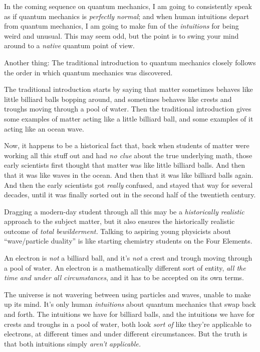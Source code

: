 {
 In the coming sequence on quantum mechanics, I am going to
consistently speak as if quantum mechanics is \textit{perfectly
normal}; and when human intuitions depart from quantum mechanics, I am
going to make fun of the \textit{intuitions} for being weird and
unusual. This may seem odd, but the point is to swing your mind around
to a \textit{native} quantum point of view.}

{
 Another thing: The traditional introduction to quantum mechanics
closely follows the order in which quantum mechanics was discovered.}

{
 The traditional introduction starts by saying that matter
sometimes behaves like little billiard balls bopping around, and
sometimes behaves like crests and troughs moving through a pool of
water. Then the traditional introduction gives some examples of matter
acting like a little billiard ball, and some examples of it acting like
an ocean wave.}

{
 Now, it happens to be a historical fact that, back when students
of matter were working all this stuff out and had \textit{no clue}
about the true underlying math, those early scientists first thought
that matter was like little billiard balls. And then that it was like
waves in the ocean. And then that it was like billiard balls again. And
then the early scientists got \textit{really} confused, and stayed that
way for several decades, until it was finally sorted out in the second
half of the twentieth century.}

{
 Dragging a modern-day student through all this may be a
\textit{historically realistic} approach to the subject matter, but it
also ensures the historically realistic outcome of \textit{total
bewilderment.} Talking to aspiring young physicists about
``wave/particle duality'' is like
starting chemistry students on the Four Elements.}

{
 An electron is \textit{not} a billiard ball, and
it's \textit{not} a crest and trough moving through a
pool of water. An electron is a mathematically different sort of
entity, \textit{all the time and under all circumstances}, and it has
to be accepted on its own terms.}

{
 The universe is not wavering between using particles and waves,
unable to make up its mind. It's only human
\textit{intuitions} about quantum mechanics that swap back and forth.
The intuitions we have for billiard balls, and the intuitions we have
for crests and troughs in a pool of water, both look \textit{sort of}
like they're applicable to electrons, at different
times and under different circumstances. But the truth is that both
intuitions simply \textit{aren't applicable.}}

